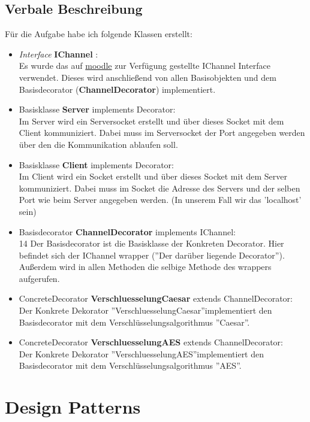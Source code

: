\subsection{Verbale Beschreibung}
Für die Aufgabe habe ich folgende Klassen erstellt:
\begin{itemize}
	\item \textit{Interface} \textbf{IChannel} :\\
		Es wurde das auf \href{https://elearning.tgm.ac.at/pluginfile.php/56383/mod\_assign/introattachment/0/IChannel.java?forcedownload=1}{moodle} zur Verfügung gestellte IChannel Interface verwendet. Dieses wird anschließend von allen Basisobjekten und dem Basisdecorator (\textbf{ChannelDecorator}) implementiert.
	\item Basisklasse \textbf{Server} implements Decorator:\\
		Im Server wird ein Serversocket erstellt und über dieses Socket mit dem Client kommuniziert. Dabei muss im Serversocket der Port angegeben werden über den die Kommunikation ablaufen soll.
	\item Basisklasse \textbf{Client} implements Decorator:\\
		Im Client wird ein Socket erstellt und über dieses Socket mit dem Server kommuniziert. Dabei muss im Socket die Adresse des Servers und der selben Port wie beim Server angegeben werden. (In unserem Fall wir das 'localhost' sein)
	\item Basisdecorator \textbf{ChannelDecorator} implements IChannel:\\14
		Der Basisdecorator ist die Basisklasse der Konkreten Decorator. Hier befindet sich der IChannel wrapper (''Der darüber liegende Decorator''). Außerdem wird in allen Methoden die selbige Methode des wrappers aufgerufen.
	\item ConcreteDecorator \textbf{VerschluesselungCaesar} extends ChannelDecorator:\\
		Der Konkrete Dekorator ''VerschluesselungCaesar''implementiert den Basisdecorator mit dem Verschlüsselungsalgorithmus ''Caesar''.
	\item ConcreteDecorator \textbf{VerschluesselungAES} extends ChannelDecorator:\\
	Der Konkrete Dekorator ''VerschluesselungAES''implementiert den Basisdecorator mit dem Verschlüsselungsalgorithmus ''AES''.
\end{itemize}
\section{Design Patterns}
